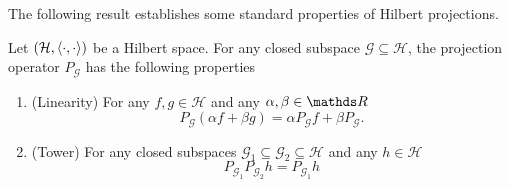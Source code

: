 The following result establishes some standard properties of Hilbert
projections.
\begin{prop}
\label{prop:propertiesHilbertProjection} Let $(\mathcal{H},\langle\cdot,\cdot\rangle)$
be a Hilbert space. For any closed subspace $\mathcal{G\subseteq\mathcal{H}}$,
the projection operator $P_{\mathcal{G}}$ has the following properties

\begin{enumerate}[label=(\roman*),leftmargin=.1\linewidth,rightmargin=.4\linewidth]
	\item (Linearity) For any $f,g \in \mathcal{H}$ and any $\alpha,\beta \in \R$
			\[
					P_{\mathcal{G}}\left(\alpha f + \beta g\right) = \alpha P_{\mathcal{G}}f + \beta P_{\mathcal{G}}. 
			\]
	\item (Tower) For any closed subspaces $\mathcal{G}_1 \subseteq \mathcal{G}_2 \subseteq \mathcal{H}$ and any $h \in \mathcal{H}$
			\[
					P_{\mathcal{G}_1} P_{\mathcal{G}_2}h = P_{\mathcal{G}_1}h
			\]
\end{enumerate}
\end{prop}

